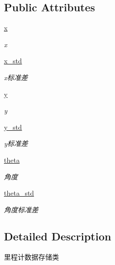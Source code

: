 \subsection*{Public Attributes}
\begin{DoxyCompactItemize}
\item 
\hyperlink{classfuse___g___a__dox_1_1_odom__unit_a8f5d8752c0790e0c4d87487511de5d5e}{x}
\begin{DoxyCompactList}\small\item\em x \end{DoxyCompactList}\item 
\hyperlink{classfuse___g___a__dox_1_1_odom__unit_a3ab7f9b264c575389acee425e8ec3b25}{x\+\_\+std}
\begin{DoxyCompactList}\small\item\em x标准差 \end{DoxyCompactList}\item 
\hyperlink{classfuse___g___a__dox_1_1_odom__unit_affc273cc9816b6384d3345de60cdec69}{y}
\begin{DoxyCompactList}\small\item\em y \end{DoxyCompactList}\item 
\hyperlink{classfuse___g___a__dox_1_1_odom__unit_a1169c2863738dc9ed2f8527700e312b2}{y\+\_\+std}
\begin{DoxyCompactList}\small\item\em y标准差 \end{DoxyCompactList}\item 
\hyperlink{classfuse___g___a__dox_1_1_odom__unit_ad864893c7fc67898f7f18e83f846a927}{theta}
\begin{DoxyCompactList}\small\item\em 角度 \end{DoxyCompactList}\item 
\hyperlink{classfuse___g___a__dox_1_1_odom__unit_a9284f87eb0eb331da4bec2760634b356}{theta\+\_\+std}
\begin{DoxyCompactList}\small\item\em 角度标准差 \end{DoxyCompactList}\end{DoxyCompactItemize}


\subsection{Detailed Description}
里程计数据存储类 



